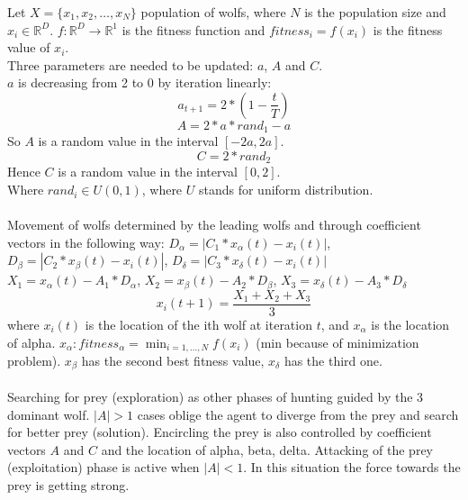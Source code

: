 \documentclass[border=0.2cm]{report}
\newcommand{\R}{\mathbb{R}} %
\begin{document}
\noindent
Let $X=\{x_1,x_2,\ldots,x_N\}$ population of wolfs, where $N$ is the population size and $x_i \in \R^D$.
$f: \R^{D}\to\R^1$ is the fitness function and $fitness_i=f(x_i)$ is the fitness value of $x_i$.\\
\noindent
Three parameters are needed to be updated: $a$, $A$ and $C$. \\
$a$ is decreasing from 2 to 0 by iteration linearly: \\
\begin{equation}\label{eqn_gwo_a_param}
a_{t+1}=2*(1-\frac{t}{T}) 
\end{equation}
\begin{equation}\label{eqn_gwo_A_param}
A=2*a*rand_{1}-a
\end{equation}
So $A$ is a random value in the interval $[-2a,2a]$. \\
\begin{equation}\label{eqn_gwo_C_param}
C=2*rand_{2}
\end{equation}
Hence $C$ is a random value in the interval $[0,2]$. \\
Where $rand_{i} \in U(0, 1)$, where $U$ stands for uniform distribution. \\ \\
Movement of wolfs determined by the leading wolfs and through coefficient vectors in the following way:
$D_{\alpha}=|C_1*x_{\alpha}(t)-x_i(t)|$, $D_{\beta}=|C_2*x_{\beta}(t)-x_i(t)|$, $D_{\delta}=|C_3*x_{\delta}(t)-x_i(t)|$ \\
$X_1=x_{\alpha}(t)-A_1*D_{\alpha}$, $X_2=x_{\beta}(t)-A_2*D_{\beta}$, $X_3=x_{\delta}(t)-A_3*D_{\delta}$ \\
\begin{equation}\label{eqn_gwo_step}
x_i(t+1)=\frac{X_1+X_2+X_3}{3}
\end{equation}
where $x_i(t)$ is the location of the ith wolf at iteration $t$, and $x_{\alpha}$ is the location of alpha. $x_{\alpha}: fitness_{\alpha}=\displaystyle \min_{i=1,\dots, N}f(x_i)$ (min because of minimization problem). $x_{\beta}$ has the second best fitness value, $x_{\delta}$ has the third one.\\ \\
Searching for prey (exploration) as other phases of hunting guided by the 3 dominant wolf. $|A|>1$ cases oblige the agent to diverge from the prey and search for better prey (solution). Encircling the prey is also controlled by coefficient vectors $A$ and $C$ and the location of alpha, beta, delta. Attacking of the prey (exploitation) phase is active when $|A|<1$. In this situation the force towards the prey is getting strong.\\
\end{document}
